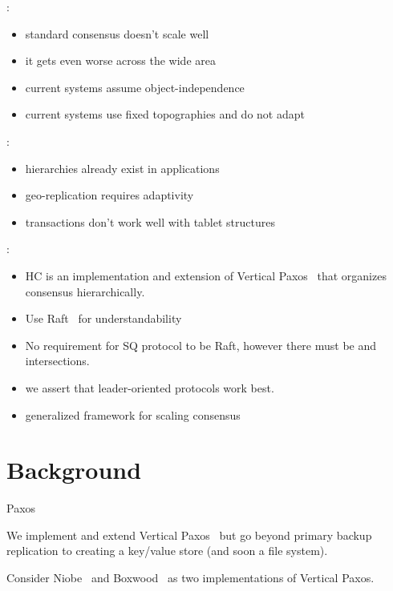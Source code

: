 \documentclass[10pt,twocolumn]{article}
\begin{document}
:

\begin{itemize}
    \item standard consensus doesn't scale well
    \item it gets even worse across the wide area
    \item current systems assume object-independence
    \item current systems use fixed topographies and do not adapt
\end{itemize}

:

\begin{itemize}
    \item hierarchies already exist in applications
    \item geo-replication requires adaptivity
    \item transactions don't work well with tablet structures 
\end{itemize}

:

\begin{itemize}
    \item HC is an implementation and extension of Vertical Paxos~\cite{vertical_paxos} that organizes consensus hierarchically.
    \item Use Raft~\cite{raft} for understandability
    \item No requirement for SQ protocol to be Raft, however there must be \roo and \sub intersections.
    \item we assert that leader-oriented protocols work best.
    \item generalized framework for scaling consensus
\end{itemize}

\section*{Background}

Paxos~\cite{fast_paxos,camargos_multicoordinated_2007,lamport_generalized_2005,epaxos,spaxos}

We implement and extend Vertical Paxos~\cite{vertical_paxos} but go beyond
primary backup replication to creating a key/value store (and soon a file
system).

Consider Niobe~\cite{niobe} and Boxwood~\cite{boxwood} as two implementations
of Vertical Paxos.
\end{document}

